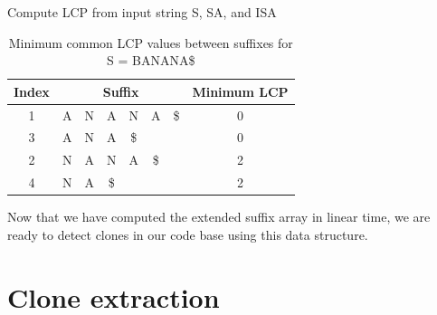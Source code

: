 \begin{algorithm}[t]
  \SetAlgoLined\DontPrintSemicolon

  \vspace{0.5cm}
  \caption{Compute LCP from input string S, SA, and ISA}
  \label{alg:lcp}
\end{algorithm}

\begin{table}[t]
    \begin{center}
        \begin{tabular}[c]{c|cccccc|c}
            Index & \multicolumn{6}{c}{Suffix} & Minimum LCP \\
            \hline
            1 & A & N & A & N & A & \$ & 0 \\ 
            3 & A & N & A & \$ &  &  & 0\\ 
            2 & N & A & N & A & \$ & & 2 \\ 
            4 & N & A & \$ & & &  & 2\\ 

        \end{tabular}
    \end{center}
    \caption{Minimum common LCP values between suffixes for S = BANANA\$}
    \label{tab:}
\end{table}

Now that we have computed the extended suffix array in linear time, we are ready to detect
clones in our code base using this data structure.

\section{Clone extraction}

